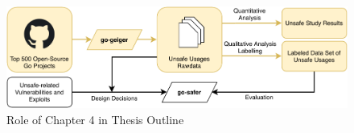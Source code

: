 \begin{figure}[ht]
    \includegraphics[width=\textwidth]{assets/figures/chapter4/outline4.pdf}
    \caption{Role of Chapter 4 in Thesis Outline}
    \label{fig:outline4}
\end{figure}
